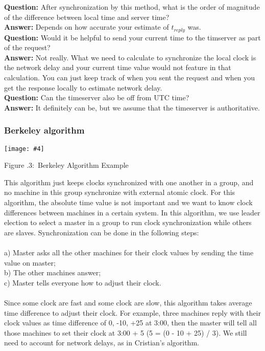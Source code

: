 \documentclass[twoside]{article}
\newcounter{lecnum}
\newcommand{\fig}[4]{
            \centerline{\texttt{[image: \#4]}}
            \begin{center}
            Figure \thelecnum.#1:~#3
            \end{center}
    }
\begin{document}
\textbf{Question:} After synchronization by this method, what is the order of magnitude of the difference between local time and server time?\\
\textbf{Answer:} Depends on how accurate your estimate of $t_{reply}$ was.\\

\textbf{Question:} Would it be helpful to send your current time to the timserver as part of the request?\\
\textbf{Answer:} Not really. What we need to calculate to synchronize the local clock is the network delay and your current time value would not feature in that calculation. You can just keep track of when you sent the request and when you get the response locally to estimate network delay.\\

\textbf{Question:} Can the timeserver also be off from UTC time?\\
\textbf{Answer:} It definitely can be, but we assume that the timeserver is authoritative.

\subsubsection{Berkeley algorithm}

\fig{3}{0.5}{Berkeley Algorithm Example}{../Pictures/berk.png}
This algorithm just keeps clocks synchronized with one another in a group, and no machine in this group synchronize with external atomic clock. For this algorithm, the absolute time value is not important and we want to know clock differences between machines in a certain system. In this algorithm, we use leader election to select a master in a group to run clock synchronization while others are slaves. Synchronization can be done in the following steps:\\\\
a) Master asks all the other machines for their clock values by sending the time value on master;\\
b) The other machines answer; \\
c) Master tells everyone how to adjust their clock.\\\\ Since some clock are fast and some clock are slow, this algorithm takes average time difference to adjust their clock. For example, three machines reply with their clock values as time difference of 0, -10, +25 at 3:00, then the master will tell all those machines to set their clock at 3:00 + 5 (5 = (0 - 10 + 25) / 3). We still need to account for network delays, as in Cristian's algorithm. 
\end{document}
